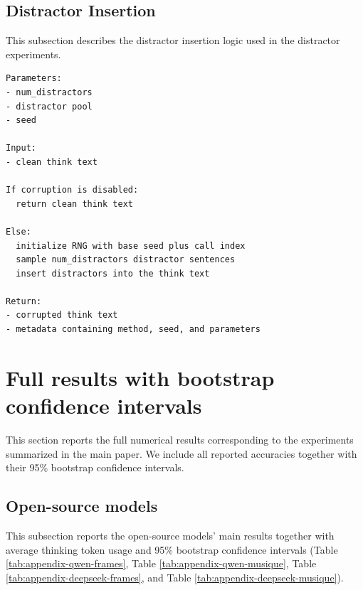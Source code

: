 \documentclass{article} %
\begin{document}
\subsection{Distractor Insertion}
This subsection describes the distractor insertion logic used in the distractor experiments.

\begin{lstlisting}[style=promptstyle]
Parameters:
- num_distractors
- distractor pool
- seed

Input:
- clean think text

If corruption is disabled:
  return clean think text

Else:
  initialize RNG with base seed plus call index
  sample num_distractors distractor sentences
  insert distractors into the think text

Return:
- corrupted think text
- metadata containing method, seed, and parameters
\end{lstlisting}

\section{Full results with bootstrap confidence intervals}
\label{appendix:confidence}
This section reports the full numerical results corresponding to the experiments summarized in the main paper. We include all reported accuracies together with their 95\% bootstrap confidence intervals.

\subsection{Open-source models}
This subsection reports the open-source models' main results together with average thinking token usage and 95\% bootstrap confidence intervals (Table \ref{tab:appendix-qwen-frames}, Table \ref{tab:appendix-qwen-musique}, Table \ref{tab:appendix-deepseek-frames}, and Table \ref{tab:appendix-deepseek-musique}).
\end{document}
